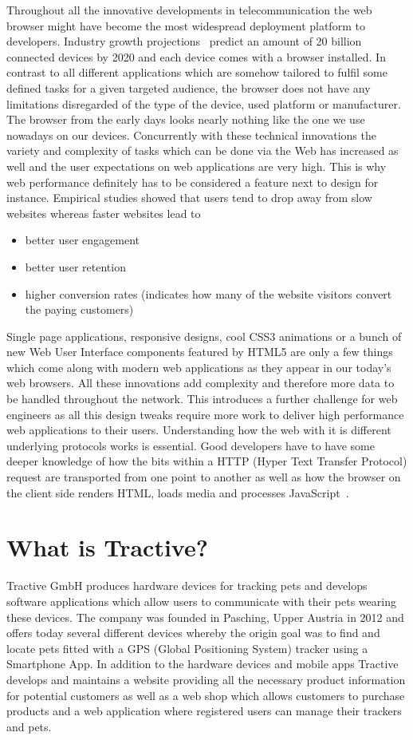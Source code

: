 Throughout all the innovative developments in telecommunication the web browser might have become the most widespread deployment platform to developers. Industry growth projections~\cite{Grigorik_2013} predict an amount of 20 billion connected devices by 2020 and each device comes with a browser installed. In contrast to all different applications which are somehow tailored to fulfil some defined tasks for a given targeted audience, the browser does not have any limitations disregarded of the type of the device, used platform or manufacturer. The browser from the early days looks nearly nothing like the one we use nowadays on our devices. Concurrently with these technical innovations the variety and complexity of tasks which can be done via the Web has increased as well and the user expectations on web applications are very high. This is why web performance definitely has to be considered a feature next to design for instance. Empirical studies showed that users tend to drop away from slow websites whereas faster websites lead to
	\begin{itemize}
		\item better user engagement
		\item better user retention
		\item higher conversion rates (indicates how many of the website visitors convert the paying customers)
	\end{itemize}
Single page applications, responsive designs, cool CSS3 animations or a bunch of new Web User Interface components featured by HTML5 are only a few things which come along with modern web applications as they appear in our today's web browsers. All these innovations add complexity and therefore more data to be handled throughout the network. This introduces a further challenge for web engineers as all this design tweaks require more work to deliver high performance web applications to their users.    
Understanding how the web with it is different underlying protocols works is essential. Good developers have to have some deeper knowledge of how the bits within a HTTP (Hyper Text Transfer Protocol) request are transported from one point to another as well as how the browser on the client side renders HTML, loads media and processes JavaScript~\cite{Grigorik_2013}.


\section{What is Tractive?}

Tractive GmbH produces hardware devices for tracking pets and develops software applications which allow users to communicate with their pets wearing these devices. The company was founded in Pasching, Upper Austria in 2012 and offers today several different devices whereby the origin goal was to find and locate pets fitted with a GPS (Global Positioning System) tracker using a Smartphone App. In addition to the hardware devices and mobile apps Tractive develops and maintains a website providing all the necessary product information for potential customers as well as a web shop which allows customers to purchase products and a web application where registered users can manage their trackers and pets. 

